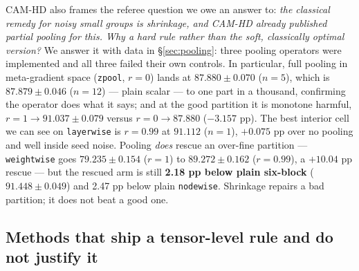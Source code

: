 \documentclass[10pt,letterpaper]{article}
\newcommand{\arm}[1]{\texttt{#1}}
\begin{document}
CAM-HD also frames the referee question we owe an answer to: \emph{the classical remedy for
noisy small groups is shrinkage, and CAM-HD already published partial pooling for this. Why a
hard rule rather than the soft, classically optimal version?} We answer it with data in
\S\ref{sec:pooling}: three pooling operators were implemented and all three failed their own
controls. In particular, full pooling in meta-gradient space (\arm{zpool}, $r = 0$) lands at
$87.880 \pm 0.070$ ($n = 5$), which is $87.879 \pm 0.046$ ($n = 12$) --- plain scalar --- to one
part in a thousand, confirming the operator does what it says; and at the good partition it is
monotone harmful, $r = 1 \rightarrow 91.037 \pm 0.079$ versus $r = 0 \rightarrow 87.880$
($-3.157$ pp). The best interior cell we can see on \arm{layerwise} is $r = 0.99$ at $91.112$
($n = 1$), $+0.075$ pp over no pooling and well inside seed noise. Pooling \emph{does} rescue an
over-fine partition --- \arm{weightwise} goes $79.235 \pm 0.154$ ($r = 1$) to
$89.272 \pm 0.162$ ($r = 0.99$), a $+10.04$ pp rescue --- but the rescued arm is still
\textbf{2.18 pp below plain six-block} ($91.448 \pm 0.049$) and 2.47 pp below plain
\arm{nodewise}. Shrinkage repairs a bad partition; it does not beat a good one.

\subsection{Methods that ship a tensor-level rule and do not justify it}
\label{sec:rw-tensor}
\end{document}
